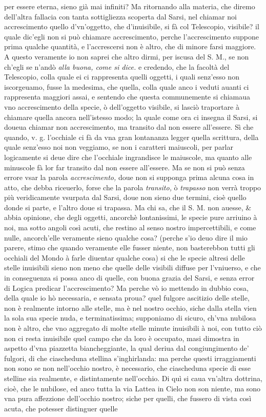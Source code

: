 \documentclass[11pt,twoside,openany]{book}
\begin{document}
per essere eterna, sieno già mai infiniti? Ma ritornando alla materia, che diremo dell'altra fallacia con tanta sottigliezza scoperta dal Sarsi, nel chiamar noi accrescimento quello d'vn'oggetto, che d'inuisibile, si fà col Telescopio, visibile? il quale dic'egli non si può chiamare accrescimento, perche l'accrescimento suppone prima qualche quantità, e l'accrescersi non è altro, che di minore farsi maggiore. A questo veramente io non saprei che altro dirmi, per iscusa del S. M., se non ch'egli se n'andò \textit{alla buona, come si dice.} e credendo, che la facoltà del Telescopio, colla quale ei ci rappresenta quelli oggetti, i quali senz'esso non iscorgeuamo, fusse la medesima, che quella, colla quale anco i veduti auanti ci rappresenta maggiori assai, e sentendo che questa communemente si chiamaua vno accrescimento della specie, ò dell'oggetto visibile, si lasciò traportare à chiamare quella ancora nell'istesso modo; la quale come ora ci insegna il Sarsi, si doueua chiamar non accrescimento, ma transito dal non essere all'essere. Sì che quando, v. g. l'occhiale ci fà da vna gran lontananza legger quella scrittura, della quale senz'esso noi non veggiamo, se non i caratteri maiuscoli, per parlar logicamente si deue dire che l'occhiale ingrandisce le maiuscole, ma quanto alle minuscole fà lor far transito dal non essere all'essere. Ma se non si può senza errore vsar la parola \textit{accrescimento,} doue non si supponga prima alcuna cosa in atto, che debba riceuerlo, forse che la parola \textit{transito,} ò \textit{trapasso} non verrà troppo più veridicamente vsurpata dal Sarsi, doue non sieno due termini, cioè quello donde si parte, e l'altro doue si trapassa. Ma chi sa, che il S. M. non auesse, \& abbia opinione, che degli oggetti, ancorchè lontanissimi, le specie pure arriuino à noi, ma sotto angoli così acuti, che restino al senso nostro impercettibili, e come nulle, ancorch'elle veramente sieno qualche cosa? (perche s'io deuo dire il mio parere, stimo che quando veramente elle fusser niente, non basterebbon tutti gli occhiali del Mondo à farle diuentar qualche cosa) si che le specie altresi delle stelle inuisibili sieno non meno che quelle delle visibili diffuse per l'vniuerso, e che in conseguenza si possa anco di quelle, con buona grazia del Sarsi, e senza error di Logica predicar l'accrescimento? Ma perche vò io mettendo in dubbio cosa, della quale io hò necessaria, e sensata proua? quel fulgore ascitizio delle stelle, non è realmente intorno alle stelle, ma è nel nostro occhio, siche dalla stella vien la sola sua specie nuda, e terminatissima; supponiamo di sicuro, ch'vna nubilosa non è altro, che vno aggregato di molte stelle minute inuisibili à noi, con tutto ciò non ci resta inuisibile quel campo che da loro è occupato, masi dimostra in aspetto d'vna piazzetta biancheggiante, la qual deriua dal congiungimento de' fulgori, di che ciascheduna stellina s'inghirlanda: ma perche questi irraggiamenti non sono se non nell'occhio nostro, è necessario, che ciascheduna specie di esse stelline sia realmente, e distintamente nell'occhio. Di quì si caua vn'altra dottrina, cioè, che le nubilose, ed anco tutta la via Lattea in Cielo non son niente, ma sono vna pura affezzione dell'occhio nostro; siche per quelli, che fussero di vista così acuta, che potesser distinguer quelle 
\end{document}
